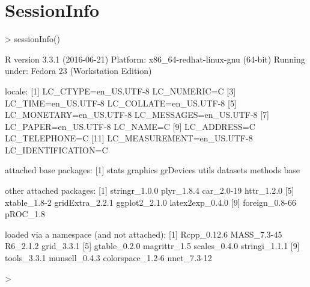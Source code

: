 \documentclass{article}
\begin{document}




\newpage
\section*{SessionInfo}

\begin{Schunk}
\begin{Sinput}
> sessionInfo()
\end{Sinput}
\begin{Soutput}
R version 3.3.1 (2016-06-21)
Platform: x86_64-redhat-linux-gnu (64-bit)
Running under: Fedora 23 (Workstation Edition)

locale:
 [1] LC_CTYPE=en_US.UTF-8       LC_NUMERIC=C              
 [3] LC_TIME=en_US.UTF-8        LC_COLLATE=en_US.UTF-8    
 [5] LC_MONETARY=en_US.UTF-8    LC_MESSAGES=en_US.UTF-8   
 [7] LC_PAPER=en_US.UTF-8       LC_NAME=C                 
 [9] LC_ADDRESS=C               LC_TELEPHONE=C            
[11] LC_MEASUREMENT=en_US.UTF-8 LC_IDENTIFICATION=C       

attached base packages:
[1] stats     graphics  grDevices utils     datasets  methods   base     

other attached packages:
 [1] stringr_1.0.0   plyr_1.8.4      car_2.0-19      httr_1.2.0     
 [5] xtable_1.8-2    gridExtra_2.2.1 ggplot2_2.1.0   latex2exp_0.4.0
 [9] foreign_0.8-66  pROC_1.8       

loaded via a namespace (and not attached):
 [1] Rcpp_0.12.6      MASS_7.3-45      R6_2.1.2         grid_3.3.1      
 [5] gtable_0.2.0     magrittr_1.5     scales_0.4.0     stringi_1.1.1   
 [9] tools_3.3.1      munsell_0.4.3    colorspace_1.2-6 nnet_7.3-12     
\end{Soutput}
\begin{Sinput}
> 
\end{Sinput}
\end{Schunk}
\end{document}
